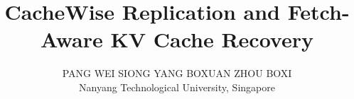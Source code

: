 \documentclass[letterpaper,twocolumn,10pt]{article}
\title{\Large\bfseries CacheWise Replication and Fetch-Aware KV Cache Recovery}
\author{{\normalfont PANG WEI SIONG \quad YANG BOXUAN \quad ZHOU BOXI}\\
  {\normalfont Nanyang Technological University, Singapore}}
\date{}
\begin{document}
\maketitle
\pagestyle{plain}

\begin{abstract}
  
\end{abstract}












\end{document}
